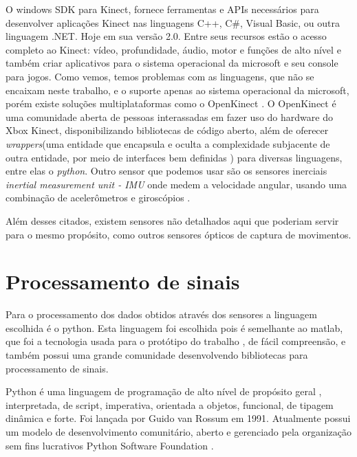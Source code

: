   O windows SDK para Kinect, fornece ferramentas e APIs necessários para desenvolver
aplicações Kinect nas linguagens  C++, C\#, Visual Basic, ou outra linguagem .NET. Hoje em sua versão 2.0. Entre seus recursos estão o acesso completo ao Kinect: vídeo,
profundidade, áudio, motor e funções de alto nível e também  criar aplicativos 
para o sistema operacional da microsoft e seu console para jogos. Como vemos, 
temos problemas com as linguagens, que não se encaixam neste trabalho, e o suporte apenas ao sistema operacional da microsoft, porém
existe soluções multiplataformas como o OpenKinect \cite{openKinect}.
  O OpenKinect é uma comunidade aberta de pessoas interassadas em fazer uso do 
hardware do Xbox Kinect, disponibilizando bibliotecas de código aberto, além 
de oferecer \textit{wrappers}(uma entidade que encapsula e oculta a complexidade
 subjacente de outra entidade, por meio de interfaces bem definidas \cite{wrapper}) 
para diversas linguagens, entre elas o \textit{python}.
  Outro sensor que podemos usar são os sensores inerciais \textit{inertial 
measurement unit - IMU} onde medem a velocidade angular, usando uma combinação 
de acelerômetros e giroscópios \cite{imu}.

   Além desses citados, existem sensores
não detalhados aqui que poderiam servir para o mesmo propósito, como outros sensores ópticos de captura de movimentos.

\section{Processamento de sinais}
\label{Sec:Processamento de sinais}
  Para o processamento dos dados obtidos através dos sensores a 
linguagem escolhida é o python. Esta linguagem foi escolhida pois é semelhante ao matlab,
que foi a tecnologia usada para o protótipo do trabalho \cite{roberto}, de fácil compreensão, e também possui uma grande comunidade desenvolvendo bibliotecas
para processamento de sinais.

  Python é uma linguagem de programação de alto nível de propósito geral \cite{python} , 
interpretada, de script, imperativa, orientada a objetos, funcional, de tipagem 
dinâmica e forte. Foi lançada por Guido van Rossum em 1991.\cite{historiaPython} Atualmente possui
 um modelo de desenvolvimento comunitário, aberto e gerenciado pela organização
 sem fins lucrativos Python Software Foundation \cite{pythonFoudation}.

